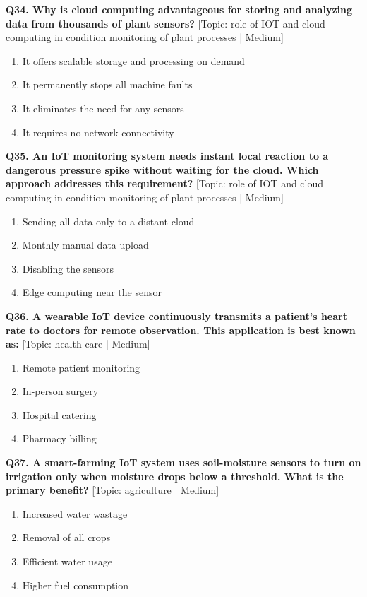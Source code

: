 \noindent\textbf{Q34. Why is cloud computing advantageous for storing and analyzing data from thousands of plant sensors?} \hfill [Topic: role of IOT and cloud computing in condition monitoring of plant processes | Medium]
\begin{enumerate}[label=(\alph*),topsep=2pt,itemsep=1pt,partopsep=0pt,parsep=0pt]
    \item {It offers scalable storage and processing on demand}
    \item {It permanently stops all machine faults}
    \item {It eliminates the need for any sensors}
    \item {It requires no network connectivity}
\end{enumerate}
\vspace{2mm}

\noindent\textbf{Q35. An IoT monitoring system needs instant local reaction to a dangerous pressure spike without waiting for the cloud. Which approach addresses this requirement?} \hfill [Topic: role of IOT and cloud computing in condition monitoring of plant processes | Medium]
\begin{enumerate}[label=(\alph*),topsep=2pt,itemsep=1pt,partopsep=0pt,parsep=0pt]
    \item {Sending all data only to a distant cloud}
    \item {Monthly manual data upload}
    \item {Disabling the sensors}
    \item {Edge computing near the sensor}
\end{enumerate}
\vspace{2mm}

\noindent\textbf{Q36. A wearable IoT device continuously transmits a patient's heart rate to doctors for remote observation. This application is best known as:} \hfill [Topic: health care | Medium]
\begin{enumerate}[label=(\alph*),topsep=2pt,itemsep=1pt,partopsep=0pt,parsep=0pt]
    \item {Remote patient monitoring}
    \item {In-person surgery}
    \item {Hospital catering}
    \item {Pharmacy billing}
\end{enumerate}
\vspace{2mm}

\noindent\textbf{Q37. A smart-farming IoT system uses soil-moisture sensors to turn on irrigation only when moisture drops below a threshold. What is the primary benefit?} \hfill [Topic: agriculture | Medium]
\begin{enumerate}[label=(\alph*),topsep=2pt,itemsep=1pt,partopsep=0pt,parsep=0pt]
    \item {Increased water wastage}
    \item {Removal of all crops}
    \item {Efficient water usage}
    \item {Higher fuel consumption}
\end{enumerate}
\vspace{2mm}

